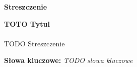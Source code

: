 \begin{center}
\textbf{Streszczenie}
\end{center}
\textbf{TOTO Tytul}
\\
\\
TODO Streszczenie


\vspace*{\baselineskip}

\noindent\textbf{Słowa kluczowe:} \textit{TODO slowa kluczowe}
